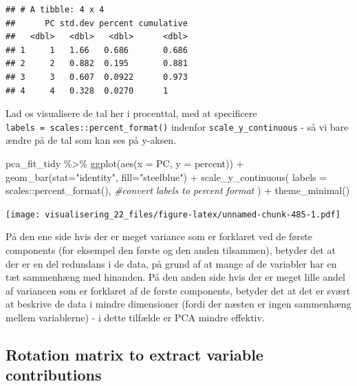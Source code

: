 \documentclass[
]{book}
\newenvironment{Shaded}{\begin{snugshade}}{\end{snugshade}}
\newcommand{\AttributeTok}[1]{\textcolor[rgb]{0.77,0.63,0.00}{#1}}
\newcommand{\CommentTok}[1]{\textcolor[rgb]{0.56,0.35,0.01}{\textit{#1}}}
\newcommand{\FunctionTok}[1]{\textcolor[rgb]{0.00,0.00,0.00}{#1}}
\newcommand{\NormalTok}[1]{#1}
\newcommand{\SpecialCharTok}[1]{\textcolor[rgb]{0.00,0.00,0.00}{#1}}
\newcommand{\StringTok}[1]{\textcolor[rgb]{0.31,0.60,0.02}{#1}}
\begin{document}
\begin{verbatim}
## # A tibble: 4 x 4
##      PC std.dev percent cumulative
##   <dbl>   <dbl>   <dbl>      <dbl>
## 1     1   1.66   0.686       0.686
## 2     2   0.882  0.195       0.881
## 3     3   0.607  0.0922      0.973
## 4     4   0.328  0.0270      1
\end{verbatim}

Lad os visualisere de tal her i procenttal, med at specificere \texttt{labels\ =\ scales::percent\_format()} indenfor \texttt{scale\_y\_continuous} - så vi bare ændre på de tal som kan ses på y-aksen.

\begin{Shaded}
\begin{Highlighting}[]
\NormalTok{pca\_fit\_tidy }\SpecialCharTok{\%\textgreater{}\%}
  \FunctionTok{ggplot}\NormalTok{(}\FunctionTok{aes}\NormalTok{(}\AttributeTok{x =}\NormalTok{ PC, }\AttributeTok{y =}\NormalTok{ percent)) }\SpecialCharTok{+}
  \FunctionTok{geom\_bar}\NormalTok{(}\AttributeTok{stat=}\StringTok{"identity"}\NormalTok{, }\AttributeTok{fill=}\StringTok{"steelblue"}\NormalTok{) }\SpecialCharTok{+}
  \FunctionTok{scale\_y\_continuous}\NormalTok{(}
    \AttributeTok{labels =}\NormalTok{ scales}\SpecialCharTok{::}\FunctionTok{percent\_format}\NormalTok{(), }\CommentTok{\#convert labels to percent format}
\NormalTok{  ) }\SpecialCharTok{+}
  \FunctionTok{theme\_minimal}\NormalTok{()}
\end{Highlighting}
\end{Shaded}

\texttt{[image: visualisering\_22\_files/figure-latex/unnamed-chunk-485-1.pdf]}

På den ene side hvis der er meget variance som er forklaret ved de første components (for eksempel den første og den anden tilsammen), betyder det at der er en del redundans i de data, på grund af at mange af de variabler har en tæt sammenhæng med hinanden. På den anden side hvis der er meget lille andel af variancen som er forklaret af de første components, betyder det at det er svært at beskrive de data i mindre dimensioner (fordi der næsten er ingen sammenhæng mellem variablerne) - i dette tilfælde er PCA mindre effektiv.

\hypertarget{rotation-matrix-to-extract-variable-contributions}{%
\subsection{Rotation matrix to extract variable contributions}\label{rotation-matrix-to-extract-variable-contributions}}
\end{document}
